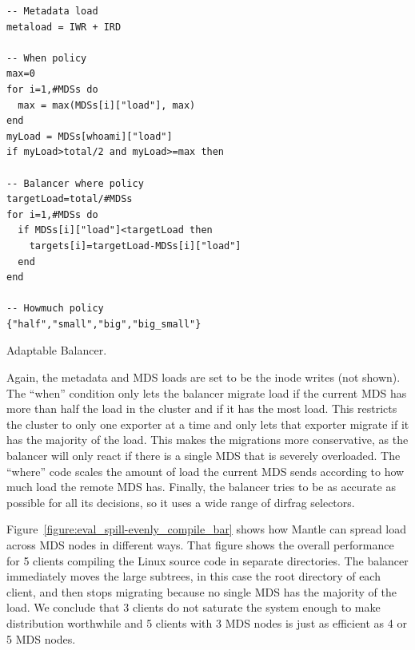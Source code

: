 \begin{listing}
	\ssp
	\begin{verbatim}
-- Metadata load
metaload = IWR + IRD

-- When policy
max=0
for i=1,#MDSs do
  max = max(MDSs[i]["load"], max)
end
myLoad = MDSs[whoami]["load"]
if myLoad>total/2 and myLoad>=max then

-- Balancer where policy
targetLoad=total/#MDSs
for i=1,#MDSs do
  if MDSs[i]["load"]<targetLoad then
    targets[i]=targetLoad-MDSs[i]["load"]
  end
end

-- Howmuch policy
{"half","small","big","big_small"}
	\end{verbatim}
	\dsp
    \caption{Adaptable Balancer.\label{listing:adaptable}}
\end{listing}

Again, the metadata and MDS loads are set to be the inode writes (not shown). The ``when'' condition only lets the balancer migrate load if the current MDS has more than half the load in the cluster and if it has the most load. This restricts the cluster to only one exporter at a time and only lets that exporter migrate if it has the majority of the load. This makes the migrations more conservative, as the balancer will only react if there is a single MDS that is severely overloaded. The ``where'' code scales the amount of load the current MDS sends according to how much load the remote MDS has. Finally, the balancer tries to be as accurate as possible for all its decisions, so it uses a wide range of dirfrag selectors.

Figure~\ref{figure:eval_spill-evenly_compile_bar} shows how Mantle can spread load across MDS nodes in different ways. That figure shows the overall performance for 5 clients compiling the Linux source code in separate directories. The balancer immediately moves the large subtrees, in this case the root directory of each client, and then stops migrating because no single MDS has the majority of the load. We conclude that 3 clients do not saturate the system enough to make distribution worthwhile and 5 clients with 3 MDS nodes is just as efficient as 4 or 5 MDS nodes. 

